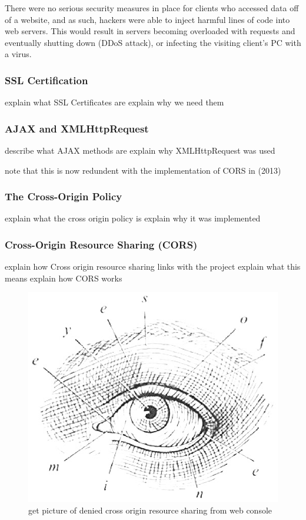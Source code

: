 \documentclass[12pt,a4paper]{article}
\begin{document}
There were no serious security measures in place for clients who accessed data off of a website, and as such, hackers were able to inject harmful lines of code into web servers. This would result in servers becoming overloaded with requests and eventually shutting down (DDoS attack), or infecting the visiting client's PC with a virus.

\subsubsection{SSL Certification}

explain what SSL Certificates are
explain why we need them

\subsubsection{AJAX and XMLHttpRequest}

describe what AJAX methods are
explain why XMLHttpRequest was used

note that this is now redundent with the implementation of CORS in (2013)

\subsubsection{The Cross-Origin Policy}

explain what the cross origin policy is
explain why it was implemented


\subsubsection{Cross-Origin Resource Sharing (CORS)}

explain how Cross origin resource sharing links with the project
explain what this means
explain how CORS works

\begin{figure}
\centering
    \includegraphics[scale = 0.5]{eye.eps}
    \caption{get picture of denied cross origin resource sharing from web console}
    \label{fig:CORS}
\end{figure}
\end{document}
